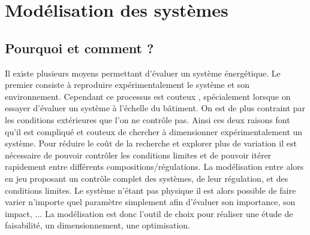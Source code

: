 

\section{Modélisation des systèmes} %
\label{sec:modelisation_des_systemes}

\subsection{Pourquoi et comment ?} %
\label{sub:pourquoi_et_comment}
Il existe plusieurs moyens permettant d’évaluer un système énergétique. Le premier
consiste à reproduire expérimentalement le système et son environnement. Cependant
ce processus est couteux , spécialement lorsque on essayer d’évaluer un système à l’échelle
du bâtiment. On est de plus contraint par les conditions extérieures que l’on ne contrôle
pas. Ainsi ces deux raisons font qu’il est compliqué et couteux de chercher à dimensionner
expérimentalement un système. Pour réduire le coût de la recherche et explorer plus de
variation il est nécessaire de pouvoir contrôler les conditions limites et de pouvoir
itérer rapidement entre différents compositions/régulations. La modélisation entre alors
en jeu proposant un contrôle complet des systèmes, de leur régulation, et des conditions
limites. Le système n’étant pas physique il est alors possible de faire varier n’importe
quel paramètre simplement afin d’évaluer son importance, son impact, ...
La modélisation est donc l’outil de choix pour réaliser une étude de faisabilité, un
dimensionnement, une optimisation.




